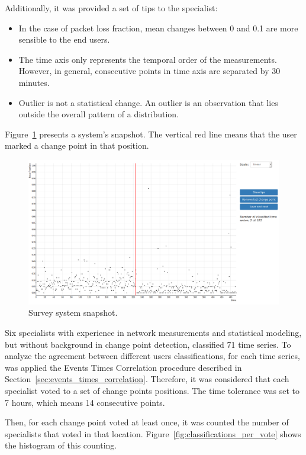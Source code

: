 Additionally, it was provided a set of tips to the specialist:

\begin{itemize}
    \item In the case of packet loss fraction, mean changes between 0 and 0.1
    are more sensible to the end users.
    \item The time axis only represents the temporal order of the measurements.
    However, in general, consecutive points in time axis are separated by 30
    minutes.
    \item Outlier is not a statistical change. An outlier is an observation that
    lies outside the overall pattern of a distribution.
\end{itemize}

Figure~\ref{fig:survey_system} presents a system's snapshot.
The vertical red line means that the user marked a change point in that
position.

\begin{figure}[H]
    \centering
    \includegraphics[width=0.9\linewidth]{./figures/methodology/supervised_learning_try/survey_system.png}
    \caption{Survey system snapshot.}
\label{fig:survey_system}
\end{figure}%

Six specialists with experience in network measurements and statistical
modeling, but without background in change point detection, classified 71 time
series.
To analyze the agreement between different users classifications,
for each time series, was applied the Events Times Correlation procedure
described in Section~\ref{sec:events_times_correlation}. Therefore, it was
considered that each specialist voted to a set of change points positions.
The time tolerance was set to 7 hours, which means 14 consecutive points.

Then, for each change point voted at least once, it was counted the number of
specialists that voted in that location.
Figure~\ref{fig:classifications_per_vote} shows the histogram of this counting.

